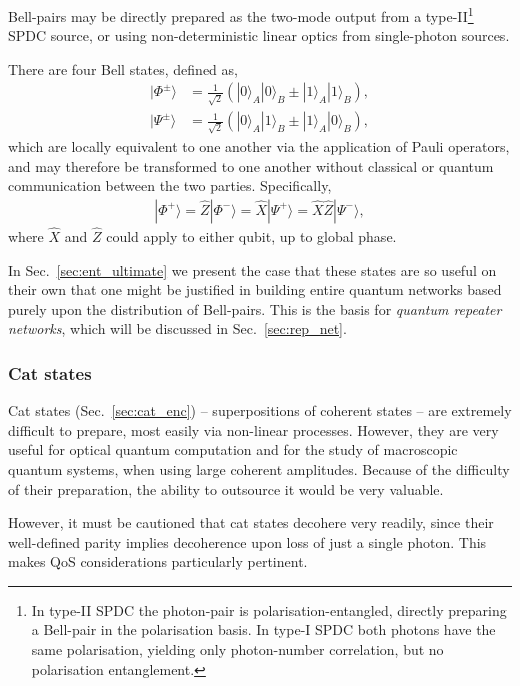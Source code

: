 \documentclass[aps, rmp, twocolumn, amsmath, amssymb, nofootinbib, superscriptaddress, longbibliography, floatfix, table-of-contents, eqsecnum]{revtex4-1}
\newcommand{\ket}[1]{|#1\rangle}
\begin{document}
Bell-pairs may be directly prepared as the two-mode output from a type-II\footnote{In type-II SPDC the photon-pair is polarisation-entangled, directly preparing a Bell-pair in the polarisation basis. In type-I SPDC both photons have the same polarisation, yielding only photon-number correlation, but no polarisation entanglement.} SPDC source, or using non-deterministic linear optics from single-photon sources.

There are four Bell states, defined as, 
\begin{align} \label{eq:bell_basis}
\ket{\Phi^{\pm}} &= \frac{1}{\sqrt{2}} (\ket{0}_A\ket{0}_B \pm \ket{1}_A\ket{1}_B), \nonumber \\
\ket{\Psi^{\pm}} &= \frac{1}{\sqrt{2}} (\ket{0}_A\ket{1}_B \pm \ket{1}_A\ket{0}_B),
\end{align}
which are locally equivalent to one another via the application of Pauli operators, and may therefore be transformed to one another without classical or quantum communication between the two parties. Specifically,
\begin{align}
\ket{\Phi^+} = \hat{Z}\ket{\Phi^-} = \hat{X}\ket{\Psi^+} = \hat{X}\hat{Z}\ket{\Psi^-},
\end{align}
where $\hat{X}$ and $\hat{Z}$ could apply to either qubit, up to global phase.

In Sec.~\ref{sec:ent_ultimate} we present the case that these states are so useful on their own that one might be justified in building entire quantum networks based purely upon the distribution of Bell-pairs. This is the basis for \textit{quantum repeater networks}, which will be discussed in Sec.~\ref{sec:rep_net}.

%
%

\subsubsection{Cat states} 

Cat states (Sec.~\ref{sec:cat_enc}) -- superpositions of coherent states -- are extremely difficult to prepare, most easily via non-linear processes. However, they are very useful for optical quantum computation and for the study of macroscopic quantum systems, when using large coherent amplitudes. Because of the difficulty of their preparation, the ability to outsource it would be very valuable.

However, it must be cautioned that cat states decohere very readily, since their well-defined parity implies decoherence upon loss of just a single photon. This makes QoS considerations particularly pertinent.
\end{document}
